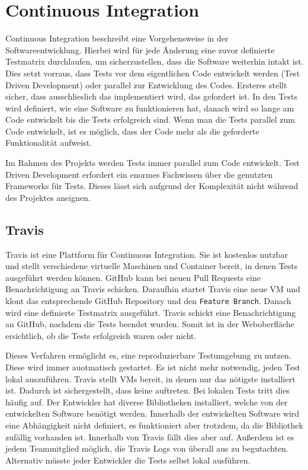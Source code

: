 {\section{Continuous Integration}
Continuous Integration beschreibt eine Vorgehensweise in der
Softwareentwicklung. Hierbei wird für jede Änderung eine zuvor definierte
Testmatrix durchlaufen, um sicherzustellen, dass die Software weiterhin intakt
ist. Dies setzt vorraus, dass Tests vor dem eigentlichen Code entwickelt werden
(Test Driven Development) oder parallel zur Entwicklung des Codes. Ersteres
stellt sicher, dass ausschlieslich das implementiert wird, das gefordert ist.
In den Tests wird definiert, wie eine Software zu funktionieren hat, danach
wird so lange am Code entwickelt bis die Tests erfolgreich sind. Wenn man die
Tests parallel zum Code entwickelt, ist es möglich, dass der Code mehr als die
geforderte Funktionalität aufweist.

Im Rahmen des Projekts werden Tests immer parallel zum Code entwickelt. Test
Driven Development erfordert ein enormes Fachwissen über die genutzten
Frameworks für Tests. Dieses lässt sich aufgrund der Komplexität nicht
während des Projektes aneignen.
\tm%

\subsection{Travis}
Travis ist eine Plattform für Continuous Integration. Sie ist kostenlos nutzbar
und stellt verschiedene virtuelle Maschinen und Container bereit, in denen
Tests ausgeführt werden können. GitHub kann bei neuen Pull Requests eine
Benachrichtigung an Travis schicken. Daraufhin startet Travis eine neue VM und
klont das entsprechende GitHub Repository und den \texttt{Feature Branch}.
Danach wird eine definierte Testmatrix ausgeführt. Travis schickt eine
Benachrichtigung an GitHub, nachdem die Tests beendet wurden. Somit ist in der
Weboberfläche ersichtlich, ob die Tests erfolgreich waren oder nicht.

Dieses Verfahren ermöglicht es, eine reproduzierbare Testumgebung zu nutzen.
Diese wird immer auotmatisch gestartet. Es ist nicht mehr notwendig, jeden Test
lokal auszuführen. Travis stellt VMs bereit, in denen nur das nötigste
installiert ist. Dadurch ist sichergestellt, dass keine  auftreten. Bei lokalen Tests tritt dies häufig auf. Der
Entwickler hat diverse Bibliotheken installiert, welche von der entwickelten
Software benötigt werden. Innerhalb der entwickelten Software wird eine
Abhängigkeit nicht definiert, es funktioniert aber trotzdem, da die Bibliothek
zufällig vorhanden ist. Innerhalb von Travis fällt dies aber auf. Außerdem ist
es jedem Teammitglied möglich, die Travis Logs von überall aus zu begutachten.
Alternativ müsste jeder Entwickler die Tests selbst lokal ausführen.
\tm%

}
